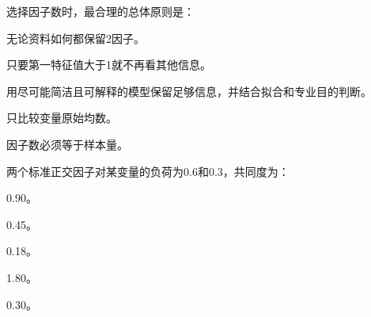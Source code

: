 \par\addvspace{6pt}\noindent\begin{minipage}{\linewidth}


选择因子数时，最合理的总体原则是：


\begin{choices}

\item 无论资料如何都保留2因子。

\item 只要第一特征值大于1就不再看其他信息。

\item 用尽可能简洁且可解释的模型保留足够信息，并结合拟合和专业目的判断。

\item 只比较变量原始均数。

\item 因子数必须等于样本量。

\end{choices}

\end{minipage}\par\vspace{4pt}

\par\addvspace{6pt}\noindent\begin{minipage}{\linewidth}


两个标准正交因子对某变量的负荷为0.6和0.3，共同度为：


\begin{choices}

\item 0.90。

\item 0.45。

\item 0.18。

\item 1.80。

\item 0.30。

\end{choices}

\end{minipage}\par\vspace{4pt}

